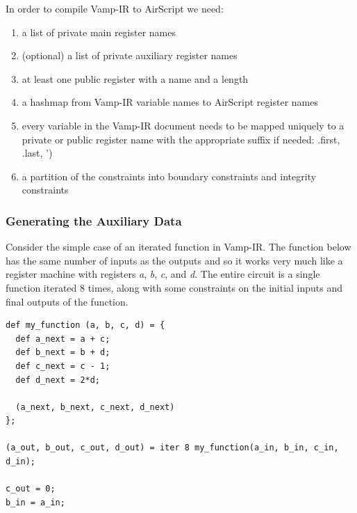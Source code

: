\documentclass[
    9pt,            %
    techreport,        %
    affiltop,       %
]{art}
\begin{document}
In order to compile Vamp-IR to AirScript we need:
\begin{enumerate}
    \item a list of private main register names
    \item (optional) a list of private auxiliary register names
    \item at least one public register with a name and a length
    \item a hashmap from Vamp-IR variable names to AirScript register names
    \item every variable in the Vamp-IR document needs to be mapped uniquely to a private or public register name with the appropriate suffix if needed: .first, .last, ')
    \item a partition of the constraints into boundary constraints and integrity constraints
\end{enumerate}


\subsubsection{Generating the Auxiliary Data}
Consider the simple case of an iterated function in Vamp-IR. The function below has the same number of inputs as the outputs and so it works very much like a register machine with registers \textit{a}, \textit{b}, \textit{c}, and \textit{d}. The entire circuit is a single function iterated 8 times, along with some constraints on the initial inputs and final outputs of the function.

\begin{verbatim}
def my_function (a, b, c, d) = {
  def a_next = a + c;
  def b_next = b + d;
  def c_next = c - 1;
  def d_next = 2*d;
  
  (a_next, b_next, c_next, d_next)
};

(a_out, b_out, c_out, d_out) = iter 8 my_function(a_in, b_in, c_in, d_in);

c_out = 0;
b_in = a_in;
\end{verbatim}
\end{document}
